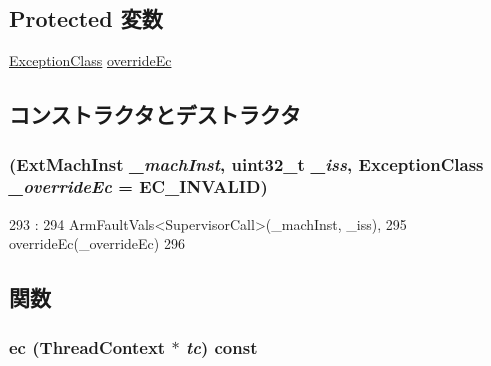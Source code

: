 \subsection*{Protected 変数}
\begin{DoxyCompactItemize}
\item 
\hyperlink{namespaceArmISA_a04034d12009cf36227f4d2abff3331a2}{ExceptionClass} \hyperlink{classArmISA_1_1SupervisorCall_af5e67d95019a0b5aba4c42205567eda7}{overrideEc}
\end{DoxyCompactItemize}


\subsection{コンストラクタとデストラクタ}
\hypertarget{classArmISA_1_1SupervisorCall_a138ed4243912a600cdc9e392d4522e57}{
\subsubsection[{SupervisorCall}]{ (ExtMachInst {\em \_\-machInst}, \/  {\bf uint32\_\-t} {\em \_\-iss}, \/  {\bf ExceptionClass} {\em \_\-overrideEc} = {\ttfamily EC\_\-INVALID})}}
\label{classArmISA_1_1SupervisorCall_a138ed4243912a600cdc9e392d4522e57}



\begin{DoxyCode}
293                                                             :
294         ArmFaultVals<SupervisorCall>(_machInst, _iss),
295         overrideEc(_overrideEc)
296     {}

\end{DoxyCode}


\subsection{関数}
\hypertarget{classArmISA_1_1SupervisorCall_aefab73b22a74d7c48b8a23230906d7cd}{
\subsubsection[{ec}]{ ec ({\bf ThreadContext} $\ast$ {\em tc}) const}}
\label{classArmISA_1_1SupervisorCall_aefab73b22a74d7c48b8a23230906d7cd}


